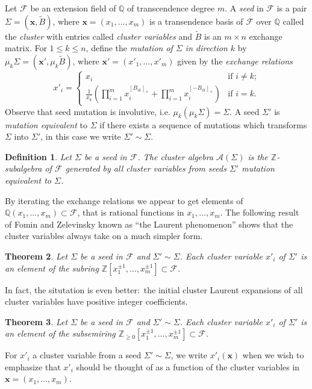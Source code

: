 \documentclass{amsart}
\newtheorem{theorem}{Theorem}[section]
\newtheorem{definition}[theorem]{Definition}
\newcommand{\bfx}{\mathbf{x}}
\newcommand{\cA}{\mathcal{A}}
\newcommand{\cF}{\mathcal{F}}
\newcommand{\QQ}{\mathbb{Q}}
\newcommand{\ZZ}{\mathbb{Z}}
\begin{document}
Let $\cF$ be an extension field of $\QQ$ of transcendence degree $m$.   
A \emph{seed} in $\cF$ is a pair $\Sigma=(\bfx,\tilde B)$, where $\bfx=(x_1,\ldots,x_m)$ is a transendence basis of $\cF$ over $\QQ$ called the \emph{cluster} with entries called \emph{cluster variables} and $\tilde B$ is an $m\times n$ exchange matrix.
For $1\le k\le n$, define the \emph{mutation of $\Sigma$ in direction $k$} by $\mu_k\Sigma=(\bfx',\mu_k\tilde B)$, where $\bfx'=(x'_1,\ldots,x'_m)$ given by the \emph{exchange relations}
\begin{equation}
  \label{eq:exchange relations}
  x'_i=\begin{cases} x_i & \text{if $i\ne k$;}\\ \frac{1}{x_k}\left(\prod\limits_{i=1}^m x_i^{[B_{ik}]_+}+\prod\limits_{i=1}^m x_i^{[-B_{ik}]_+}\right) & \text{if $i=k$.}\end{cases}
\end{equation}
Observe that seed mutation is involutive, i.e. $\mu_k(\mu_k\Sigma)=\Sigma$.
A seed $\Sigma'$ is \emph{mutation equivalent} to $\Sigma$ if there exists a sequence of mutations which transforms $\Sigma$ into $\Sigma'$, in this case we write $\Sigma'\sim\Sigma$.
\begin{definition}
  Let $\Sigma$ be a seed in $\cF$.  The \emph{cluster algebra} $\cA(\Sigma)$ is the $\ZZ$-subalgebra of $\cF$ generated by all cluster variables from seeds $\Sigma'$ mutation equivalent to $\Sigma$.
\end{definition}
By iterating the exchange relations we appear to get elements of $\QQ(x_1,\ldots,x_m)\subset\cF$, that is rational functions in $x_1,\ldots,x_m$.  
The following result of Fomin and Zelevinsky known as ``the Laurent phenomenon'' shows that the cluster variables always take on a much simpler form.
\begin{theorem}\cite{fomin-zelevinsky1}
  Let $\Sigma$ be a seed in $\cF$ and $\Sigma'\sim\Sigma$.  Each cluster variable $x'_i$ of $\Sigma'$ is an element of the subring $\ZZ[x_1^{\pm1},\ldots,x_m^{\pm1}]\subset\cF$.
\end{theorem}


In fact, the situtation is even better:\ the initial cluster Laurent expansions of all cluster variables have positive integer coefficients.
\begin{theorem}\cite{lee-schiffler, gross-hacking-keel-kontsevich}
  Let $\Sigma$ be a seed in $\cF$ and $\Sigma'\sim\Sigma$.  Each cluster variable $x'_i$ of $\Sigma'$ is an element of the subsemiring $\ZZ_{\ge0}[x_1^{\pm1},\ldots,x_m^{\pm1}]\subset\cF$. 
\end{theorem}
For $x'_i$ a cluster variable from a seed $\Sigma'\sim\Sigma$, we write $x'_i(\bfx)$ when we wish to emphasize that $x'_i$ should be thought of as a function of the cluster variables in $\bfx=(x_1,\ldots,x_m)$.
\end{document}
